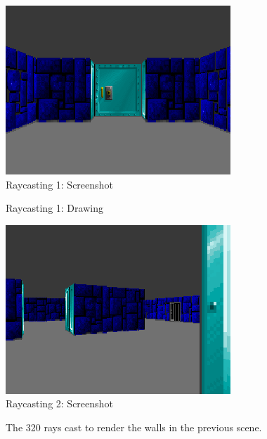 \begin{minipage}{\linewidth}

\end{minipage}


\begin{figure}[H]
  \centering
 \includegraphics[scale=1.3]{imgs/ray_caster_explained/beginning.png}
 \caption{Raycasting 1: Screenshot} \label{fig:Raycasting2Drawing}
\end{figure}

\begin{figure}[H]
  \centering
  
 \caption{Raycasting 1: Drawing} \label{fig:Raycasting1}
\end{figure}




\begin{figure}[H]
  \centering
 \includegraphics[scale=1.3]{imgs/ray_caster_explained/out_door.png}
 \caption{Raycasting 2: Screenshot} \label{fig:Raycasting2Drawing}
\end{figure}

\begin{figure}[H]
\centering
 
 \caption{The 320 rays cast to render the walls in the previous scene.} \label{fig:Raycasting2}
\end{figure}
 
